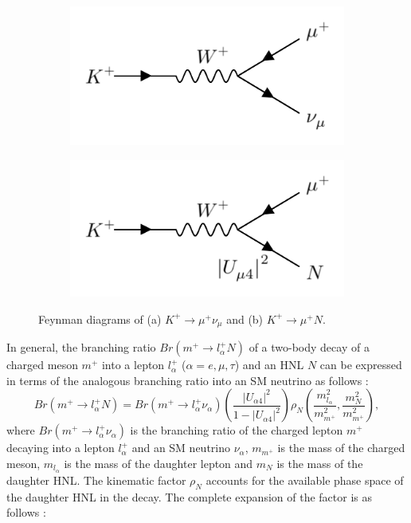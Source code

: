\begin{figure}[ht!]
\begin{subfigure}[h]{0.4\linewidth}
\centering    
\includegraphics[width=\linewidth]{K_to_nu}
\caption{}
\label{fig:kaonnu}
\end{subfigure}
\hfill
\begin{subfigure}[h]{0.4\linewidth}
\centering    
\includegraphics[width=\linewidth]{K_to_HNL}
\caption{}
\label{fig:kaonhnl}
\end{subfigure}%
\caption[Neutrino and Heavy Neutral Lepton Production Feynman Diagrams]
{
	Feynman diagrams of (a) $K^+ \rightarrow \mu^+ \nu_{\mu}$ and (b) $K^+ \rightarrow \mu^+ N$.%
}
\end{figure}

In general, the branching ratio $Br(m^+\rightarrow l^{+}_{\alpha}N)$ of a two-body decay of a charged meson $m^+$ into a lepton $l^{+}_{\alpha}$ ($\alpha=e,\mu,\tau$) and an HNL $N$ can be expressed in terms of the analogous branching ratio into an SM neutrino as follows \cite{HNLKelly}:
\begin{equation}
	\label{eq:kaon_decay_hnl}
	Br(m^+\rightarrow l^{+}_{\alpha}N) = Br(m^+\rightarrow l^{+}_{\alpha}\nu_{\alpha})\left(\frac{|U_{\alpha 4}|^{2}}{1 - |U_{\alpha 4}|^{2}}\right)\rho_{N}\left(\frac{m^{2}_{l_{\alpha}}}{m^{2}_{m^+}}, \frac{m^{2}_{N}}{m^{2}_{m^+}} \right),
\end{equation}
where $Br(m^+\rightarrow l^{+}_{\alpha}\nu_{\alpha})$ is the branching ratio of the charged lepton $m^+$ decaying into a lepton $l^+_{\alpha}$ and an SM neutrino $\nu_{\alpha}$, $m_{m^+}$ is the mass of the charged meson, $m_{l_{\alpha}}$ is the mass of the daughter lepton and $m_{N}$ is the mass of the daughter HNL.
The kinematic factor $\rho_{N}$ accounts for the available phase space of the daughter HNL in the decay.
The complete expansion of the factor is as follows \cite{HNLKelly}:

